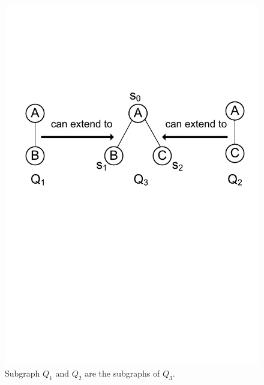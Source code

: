 
\begin{figure}[t!]
	\centering
	\includegraphics[scale=0.32]{images/avoiding}
	\vspace{-2mm}
	\caption{\scriptsize Subgraph $Q_1$ and $Q_2$ are the subgraphs of $Q_3$.}
	\label{fig:avoiding}
	\vspace{-6mm}
\end{figure}


